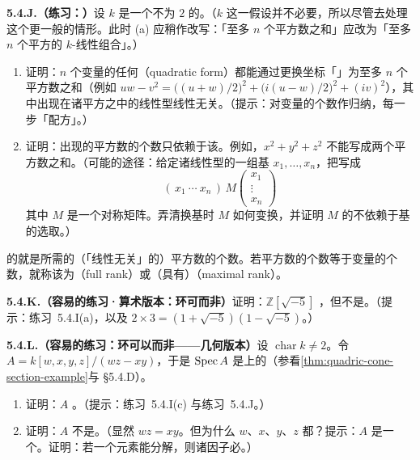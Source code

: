 \textbf{5.4.J.（练习：\trDiagonalize{}\trQuadraticForm{}）}\quad 设 $k$ 是一个\trCharacteristic{}不为 $2$ 的\trAlgClosedField。（$k$ \trAlgClosed{}这一假设并不必要，所以尽管去处理这个更一般的情形。此时 (a) 应稍作改写：「至多 $n$ 个平方数之和」应改为「至多 $n$ 个平方的 $k$-线性组合」。）
\begin{enumerate}[label=(\alph*)]
  \item 证明：$n$ 个变量的任何\textbf{\trQuadraticForm{}}（quadratic form）都能通过更换坐标「\trDiagonalize{}」为至多 $n$ 个平方数之和（例如 $uw-v^2=\bigl((u+w)/2\bigr)^2+\bigl(i(u-w)/2\bigr)^2+(iv)^2$），其中出现在诸平方之中的线性型线性无关。（提示：对变量的个数作归纳，每一步「配方」。）
  \item 证明：出现的平方数的个数只依赖于该\trQuadraticForm{}。例如，$x^2+y^2+z^2$ 不能写成两个平方数之和。（可能的途径：给定诸线性型的一组基 $x_1,\dots,x_n$，把\trQuadraticForm{}写成
\[
(\,x_1\ \cdots\ x_n\,)\,M\begin{pmatrix}x_1\\ \vdots\\ x_n\end{pmatrix}
\]
其中 $M$ 是一个对称矩阵。弄清换基时 $M$ 如何变换，并证明 $M$ 的\trRank{}不依赖于基的选取。）
\end{enumerate}
\trQuadraticForm{}的\textbf{\trRank}就是所需的（「线性无关」的）平方数的个数。若平方数的个数等于变量的个数，就称该\trQuadraticForm{}为\textbf{\trFullRank{}}（full rank）或（具有）\textbf{\trMaximalRank{}}（maximal rank）。

\textbf{5.4.K.（容易的练习·算术版本：环可\trIntegrallyClosed{}而非\trUFD）}\quad 证明：$\mathbb{Z}[\sqrt{-5}]$ \trIntegrallyClosed{}，但不是\trUFD。（提示：练习~5.4.I(a)，以及 $2\times 3=(1+\sqrt{-5})(1-\sqrt{-5})$。）

\textbf{5.4.L.（容易的练习：环可以\trIntegrallyClosed{}而非\trUFD——几何版本）}\quad 设 $\operatorname{char}k\neq 2$。令 $A=k[w,x,y,z]/(wz-xy)$，于是 $\operatorname{Spec} A$ 是\trSmooth\trQuadricSurface{}上的\trCone（参看\cref{thm:quadric-cone-section-example}与 \S5.4.D）。
\begin{enumerate}[label=(\alph*)]
  \item 证明：$A$ \trIntegrallyClosed{}。（提示：练习~5.4.I(c) 与练习~5.4.J。）
  \item 证明：$A$ 不是\trUFD。（显然 $wz=xy$。但为什么 $w$、$x$、$y$、$z$ 都\trIrreducible？提示：$A$ 是一个\trGrading\trIntegralDomain。证明：若一个\trHomogeneous{}元素能分解，则诸因子必\trHomogeneous。）
\end{enumerate}

